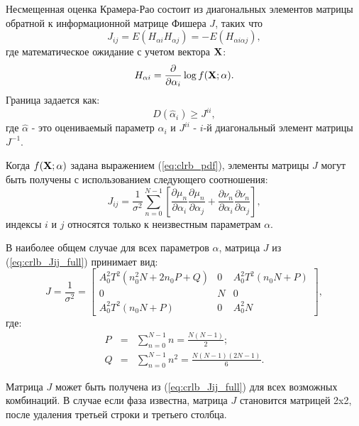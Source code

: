 Несмещенная оценка Крамера-Рао состоит из диагональных элементов матрицы обратной к информационной матрице Фишера ${J}$, таких что
\begin{equation}
	\label{eq:crlb_Jij}
	J_{ij} = E(H_{\alpha i} H_{\alpha j}) = -E(H_{\alpha i \alpha j}),
\end{equation}
где математическое ожидание с учетом вектора ${\bf{X}}$:
\begin{equation}
	\label{eq:crlb_H}
	H_{\alpha i} = \frac{\partial}{\partial \alpha_i} \log{f({\bf{X}}; {\bf{\alpha}})}.
\end{equation}
Граница задается как:
\begin{equation}
	\label{eq:crlb_var_alpha}
	D(\hat{\alpha}_i) \ge J^{ii},
\end{equation}
где ${\hat{\alpha}}$ - это оцениваемый параметр ${\alpha_i}$ и ${J^{ii}}$ - ${i}$-й диагональный элемент матрицы ${J^{-1}}$.

Когда ${f({\bf{X}}; {\bf{\alpha}})}$ задана выражением (\ref{eq:clrb_pdf}), элементы матрицы ${J}$ могут быть получены с использованием следующего соотношения:
\begin{equation}
	\label{eq:crlb_Jij_full}
	J_{ij} = \frac{1}{\sigma^2} \sum_{n=0}^{N-1} \left[ \frac{\partial \mu_n}{\partial \alpha_i} \frac{\partial \mu_n}{\partial \alpha_j} + \frac{\partial \nu_n}{\partial \alpha_i} \frac{\partial \nu_n}{\partial \alpha_j} \right],
\end{equation}
индексы ${i}$ и ${j}$ относятся только к неизвестным параметрам ${\alpha}$.

В наиболее общем случае для всех параметров ${\alpha}$, матрица ${J}$ из (\ref{eq:crlb_Jij_full}) принимает вид:
\begin{equation}
	J = \frac{1}{\sigma^2} =
		\left[ \begin{array}{ccc}
			A_0^2 T^2 (n_0^2 N + 2n_0P + Q) & 0 & A_0^2 T^2 (n_0 N + P) \\
			0 & N & 0 \\
			A_0^2 T^2 (n_0 N + P) & 0 & A_0^2N
		\end{array} \right],
\end{equation}
где:
\begin{eqnarray}
	\label{eq:clrb_QP}
	P & = & \sum_{n=0}^{N-1}n = \frac{N(N-1)}{2}; \\
	Q & = & \sum_{n=0}^{N-1}n^2 = \frac{N(N-1)(2N-1)}{6}.
\end{eqnarray}

Матрица ${J}$ может быть получена из (\ref{eq:crlb_Jij_full}) для всех возможных комбинаций. В случае если фаза известна, матрица ${J}$ становится матрицей 2x2, после удаления третьей строки
и третьего столбца.


